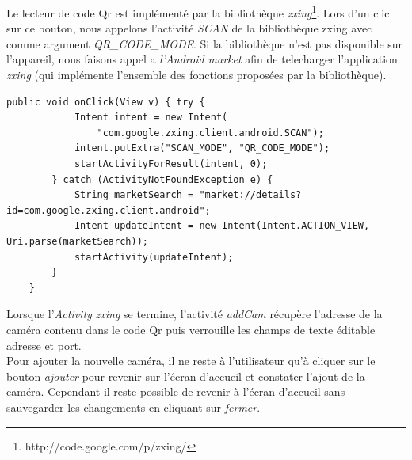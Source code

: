 \indent Le lecteur de code Qr est implémenté par la bibliothèque
\textit{zxing}\footnote{\label{zxing} http://code.google.com/p/zxing/}. \newline
Lors d'un clic sur ce bouton, nous appelons l'activité 
\textit{SCAN} de la bibliothèque zxing avec comme argument
\textit{QR\_CODE\_MODE}.\newline
Si la bibliothèque n'est pas disponible sur l'appareil, nous faisons appel a
\textit{l'Android market} afin de telecharger   l'application \textit{zxing} (qui
implémente l'ensemble des fonctions proposées par la bibliothèque).
\newpage
\begin{lstlisting}[caption={Lancement de l'activité zxing ou de l'Android
market.}] 
    public void onClick(View v) { try {
            Intent intent = new Intent(
                "com.google.zxing.client.android.SCAN");
            intent.putExtra("SCAN_MODE", "QR_CODE_MODE");
            startActivityForResult(intent, 0);
        } catch (ActivityNotFoundException e) {
            String marketSearch = "market://details?id=com.google.zxing.client.android";
            Intent updateIntent = new Intent(Intent.ACTION_VIEW, Uri.parse(marketSearch));
            startActivity(updateIntent);
        }
    }
\end{lstlisting}

\indent \newline
\indent Lorsque l'\textit{Activity} \textit{zxing} se termine, l'activité
\textit{addCam} récupère l'adresse de la caméra contenu dans le code Qr puis verrouille les
champs de texte éditable adresse et port.\\
\indent Pour ajouter la nouvelle
caméra, il ne reste à l'utilisateur qu'à cliquer sur le bouton
\textit{ajouter} pour revenir sur l'écran d'accueil et constater l'ajout de la caméra. Cependant il reste possible de revenir à l'écran d'accueil sans sauvegarder les changements en cliquant sur \textit{fermer}.

